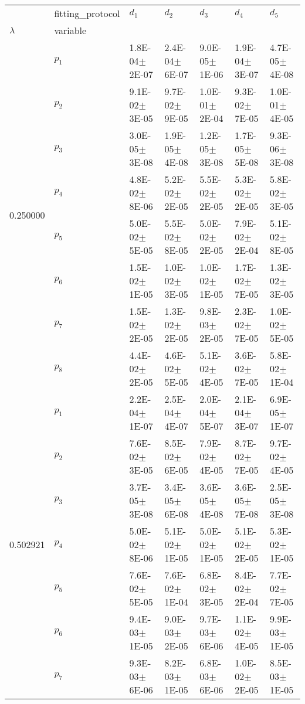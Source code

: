 \begin{tabular}{lllllll}
 & fitting_protocol & $d_1$ & $d_2$ & $d_3$ & $d_4$ & $d_5$ \\
$\lambda$ & variable &  &  &  &  &  \\
\multirow[c]{8}{*}{0.250000} & $p_1$ & 1.8E-04\(\pm\)2E-07 & 2.4E-04\(\pm\)6E-07 & 9.0E-05\(\pm\)1E-06 & 1.9E-04\(\pm\)3E-07 & 4.7E-05\(\pm\)4E-08 \\
 & $p_2$ & 9.1E-02\(\pm\)3E-05 & 9.7E-02\(\pm\)9E-05 & 1.0E-01\(\pm\)2E-04 & 9.3E-02\(\pm\)7E-05 & 1.0E-01\(\pm\)4E-05 \\
 & $p_3$ & 3.0E-05\(\pm\)3E-08 & 1.9E-05\(\pm\)4E-08 & 1.2E-05\(\pm\)3E-08 & 1.7E-05\(\pm\)5E-08 & 9.3E-06\(\pm\)3E-08 \\
 & $p_4$ & 4.8E-02\(\pm\)8E-06 & 5.2E-02\(\pm\)2E-05 & 5.5E-02\(\pm\)2E-05 & 5.3E-02\(\pm\)2E-05 & 5.8E-02\(\pm\)3E-05 \\
 & $p_5$ & 5.0E-02\(\pm\)5E-05 & 5.5E-02\(\pm\)8E-05 & 5.0E-02\(\pm\)2E-05 & 7.9E-02\(\pm\)2E-04 & 5.1E-02\(\pm\)8E-05 \\
 & $p_6$ & 1.5E-02\(\pm\)1E-05 & 1.0E-02\(\pm\)3E-05 & 1.0E-02\(\pm\)1E-05 & 1.7E-02\(\pm\)7E-05 & 1.3E-02\(\pm\)3E-05 \\
 & $p_7$ & 1.5E-02\(\pm\)2E-05 & 1.3E-02\(\pm\)2E-05 & 9.8E-03\(\pm\)2E-05 & 2.3E-02\(\pm\)7E-05 & 1.0E-02\(\pm\)5E-05 \\
 & $p_8$ & 4.4E-02\(\pm\)2E-05 & 4.6E-02\(\pm\)5E-05 & 5.1E-02\(\pm\)4E-05 & 3.6E-02\(\pm\)7E-05 & 5.8E-02\(\pm\)1E-04 \\
\multirow[c]{8}{*}{0.502921} & $p_1$ & 2.2E-04\(\pm\)1E-07 & 2.5E-04\(\pm\)4E-07 & 2.0E-04\(\pm\)5E-07 & 2.1E-04\(\pm\)3E-07 & 6.9E-05\(\pm\)1E-07 \\
 & $p_2$ & 7.6E-02\(\pm\)3E-05 & 8.5E-02\(\pm\)6E-05 & 7.9E-02\(\pm\)4E-05 & 8.7E-02\(\pm\)7E-05 & 9.7E-02\(\pm\)4E-05 \\
 & $p_3$ & 3.7E-05\(\pm\)3E-08 & 3.4E-05\(\pm\)6E-08 & 3.6E-05\(\pm\)4E-08 & 3.6E-05\(\pm\)7E-08 & 2.5E-05\(\pm\)3E-08 \\
 & $p_4$ & 5.0E-02\(\pm\)8E-06 & 5.1E-02\(\pm\)1E-05 & 5.0E-02\(\pm\)1E-05 & 5.1E-02\(\pm\)2E-05 & 5.3E-02\(\pm\)1E-05 \\
 & $p_5$ & 7.6E-02\(\pm\)5E-05 & 7.6E-02\(\pm\)1E-04 & 6.8E-02\(\pm\)3E-05 & 8.4E-02\(\pm\)2E-04 & 7.7E-02\(\pm\)7E-05 \\
 & $p_6$ & 9.4E-03\(\pm\)1E-05 & 9.0E-03\(\pm\)2E-05 & 9.7E-03\(\pm\)6E-06 & 1.1E-02\(\pm\)4E-05 & 9.9E-03\(\pm\)1E-05 \\
 & $p_7$ & 9.3E-03\(\pm\)6E-06 & 8.2E-03\(\pm\)1E-05 & 6.8E-03\(\pm\)6E-06 & 1.0E-02\(\pm\)2E-05 & 8.5E-03\(\pm\)1E-05 \\

\end{tabular}
